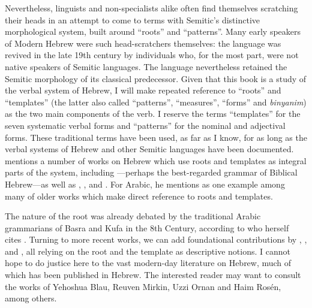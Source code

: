 \begin{exe}
\begin{xlist}
\begin{exe}
\begin{exe}
\begin{exe}
\begin{exe}
\begin{xlist}
\begin{exe}
\begin{xlist}
\begin{xlist}
\begin{xlist}
\begin{exe}
\begin{xlist}
Nevertheless, linguists and non-specialists alike often find themselves scratching their heads in an attempt to come to terms with Semitic's distinctive morphological system, built around ``roots'' and ``patterns''. Many early speakers of Modern Hebrew were such head-scratchers themselves: the language was revived in the late 19th century by individuals who, for the most part, were not native speakers of Semitic languages. The language nevertheless retained the Semitic morphology of its classical predecessor.
Given that this book is a study of the verbal system of Hebrew, I will make repeated reference to ``roots'' and ``templates'' (the latter also called ``patterns'', ``measures'', ``forms'' and \emph{binyanim}) as the two main components of the verb. I reserve the terms ``templates'' for the seven systematic verbal forms and ``patterns'' for the nominal and adjectival forms. These traditional terms have been used, as far as I know, for as long as the verbal systems of Hebrew and other Semitic languages have been documented. \cite{ussishkin00phd} mentions a number of works on Hebrew which use roots and templates as integral parts of the system, including \cite{gesenius}---perhaps the best-regarded grammar of Biblical Hebrew---as well as \cite{bopp1824}, \cite{ewald1827}, \cite{harris41} and \cite{chomsky51}. For Arabic, he mentions \cite{desacy1810} as one example among many of older works which make direct reference to roots and templates.

The nature of the root was already debated by the traditional Arabic grammarians of Basra and Kufa in the 8th Century, according to \citet[563ff]{borer13oup} who herself cites \cite{owens88}. Turning to more recent works, we can add foundational contributions by \cite{rosen77}, \cite{berman78}, \cite{bolozky78,bolozky99} and \cite{ravid90}, all relying on the root and the template as descriptive notions. I cannot hope to do justice here to the vast modern-day literature on Hebrew, much of which has been published in Hebrew. The interested reader may want to consult the works of Yehoshua Blau, Reuven Mirkin, Uzzi Ornan and Haim Ros\'en, among others.


\end{xlist}
\end{exe}
\end{xlist}
\end{xlist}
\end{xlist}
\end{exe}
\end{xlist}
\end{exe}
\end{exe}
\end{exe}
\end{exe}
\end{xlist}
\end{exe}
